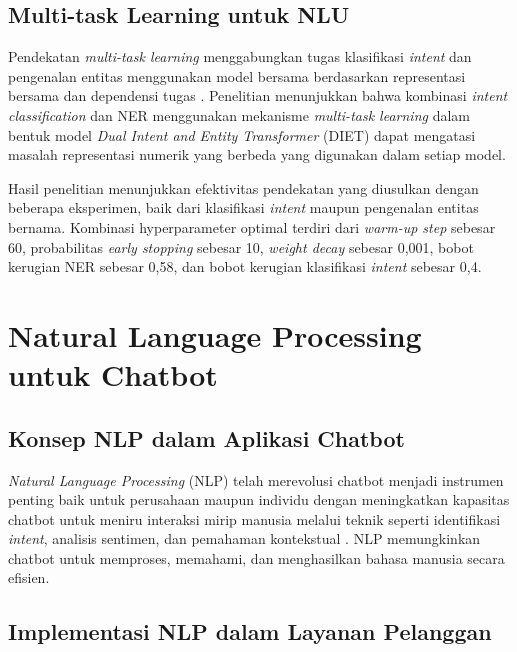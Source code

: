 \subsection{Multi-task Learning untuk NLU}

Pendekatan \textit{multi-task learning} menggabungkan tugas klasifikasi \textit{intent} dan pengenalan entitas menggunakan model bersama berdasarkan representasi bersama dan dependensi tugas \parencite{perdana2025multi}. Penelitian \textcite{annisa2024kombinasi} menunjukkan bahwa kombinasi \textit{intent classification} dan NER menggunakan mekanisme \textit{multi-task learning} dalam bentuk model \textit{Dual Intent and Entity Transformer} (DIET) dapat mengatasi masalah representasi numerik yang berbeda yang digunakan dalam setiap model.

Hasil penelitian \textcite{perdana2025multi} menunjukkan efektivitas pendekatan yang diusulkan dengan beberapa eksperimen, baik dari klasifikasi \textit{intent} maupun pengenalan entitas bernama. Kombinasi hyperparameter optimal terdiri dari \textit{warm-up step} sebesar 60, probabilitas \textit{early stopping} sebesar 10, \textit{weight decay} sebesar 0,001, bobot kerugian NER sebesar 0,58, dan bobot kerugian klasifikasi \textit{intent} sebesar 0,4.

\section{Natural Language Processing untuk Chatbot}

\subsection{Konsep NLP dalam Aplikasi Chatbot}

\textit{Natural Language Processing} (NLP) telah merevolusi chatbot menjadi instrumen penting baik untuk perusahaan maupun individu dengan meningkatkan kapasitas chatbot untuk meniru interaksi mirip manusia melalui teknik seperti identifikasi \textit{intent}, analisis sentimen, dan pemahaman kontekstual \parencite{shinde2025applications}. NLP memungkinkan chatbot untuk memproses, memahami, dan menghasilkan bahasa manusia secara efisien.

\subsection{Implementasi NLP dalam Layanan Pelanggan}

